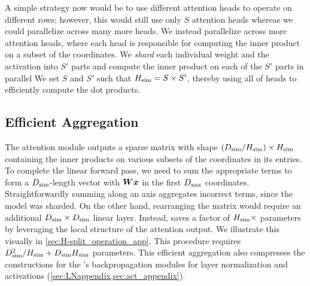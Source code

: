 A simple strategy now would be to use different attention heads to operate on different rows; however, this would still use only $S$ attention heads whereas we could parallelize across many more heads.
We instead parallelize across more attention heads, where each head is responsible for computing the inner product on a subset of the coordinates. %
We \emph{shard} each individual weight and the activation into $S'$ parts and compute the inner product on each of the $S'$ parts in parallel 
We set $S$ and $S'$ such that $H_{\text{sim}} = S\times S'$, thereby using all of \simulator{} heads to efficiently compute the dot products. 

\subsection{Efficient Aggregation}\label{sec:aggregate}
The attention module outputs a sparse matrix with shape $(D_{\text{sim}} / H_{\text{sim}})\times H_{\text{sim}}$ containing the inner products on various subsets of the coordinates in its entries.
To complete the linear forward pass, we need to sum the appropriate terms to form a $D_{\text{sim}}$-length vector with ${\bm{W}}{\bm{x}}$ in the first $D_{\text{aux}}$ coordinates.
Straightforwardly summing along an axis aggregates incorrect terms, since the model was sharded.
On the other hand, rearranging the matrix would require an additional $D_{\text{sim}}\times D_{\text{sim}}$ linear layer.
Instead, \simulator{} saves a factor of $H_{\text{sim}}\times$ parameters %
by leveraging the local structure of the attention output.
We illustrate this visually in \cref{sec:H-split_operation_app}.
This procedure requires $D_{\text{sim}}^2/H_{\text{sim}} + D_{\text{sim}}H_{\text{sim}}$ parameters. 
This efficient aggregation also compresses the constructions for the \simulator's backpropagation modules for layer normalization and activations (\cref{sec:LNappendix,sec:act_appendix}).


